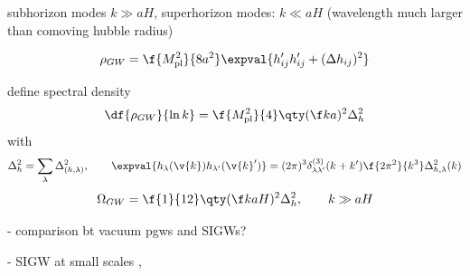 subhorizon modes $k\gg aH$, superhorizon modes: $k\ll aH$ (wavelength much larger than comoving hubble radius)

\[
\rho_{GW}=\f{M_{\rm pl}^2}{8a^2}\expval{h'_{ij}h'_{ij}+(\Delta h_{ij})^2}
\]

define spectral density
\[
\df{\rho_{GW}}{\ln k}=\f{M_{\rm pl}^2}{4}\qty(\f ka)^2\Delta_h^2
\]
with
\[
\Delta_h^2=\sum_\lambda \Delta^2_{(h,\lambda)}, \qquad \expval{h_\lambda(\v{k})h_{\lambda'}(\v{k}')}=(2\pi)^3\delta_{\lambda \lambda'}^{(3)}(k+k')\f{2\pi^2}{k^3}\Delta_{h,\lambda}^2(k)
\]
\[
\Omega_{GW}=\f{1}{12}\qty(\f k{aH})^2\Delta_h^2, \qquad k\gg aH
\]



- comparison bt vacuum pgws and SIGWs?

- SIGW at small scales
,